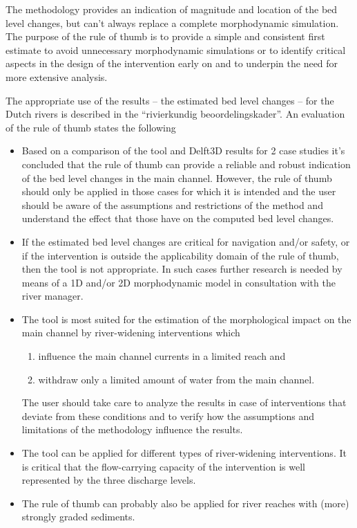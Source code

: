 The methodology provides an indication of magnitude and location of the bed level changes, but can't always replace a complete morphodynamic simulation.
The purpose of the rule of thumb is to provide a simple and consistent first estimate to avoid unnecessary morphodynamic simulations or to identify critical aspects in the design of the intervention early on and to underpin the need for more extensive analysis.

The appropriate use of the results -- the estimated bed level changes -- for the Dutch rivers is described in the ``rivierkundig beoordelingskader''.
An evaluation of the rule of thumb \citep{Paarlberg2009} states the following

\begin{itemize}

\item Based on a comparison of the tool and Delft3D results for 2 case studies it's concluded that the rule of thumb can provide a reliable and robust indication of the bed level changes in the main channel.
However, the rule of thumb should only be applied in those cases for which it is intended and the user should be aware of the assumptions and restrictions of the method and understand the effect that those have on the computed bed level changes.

\item If the estimated bed level changes are critical for navigation and/or safety, or if the intervention is outside the applicability domain of the rule of thumb, then the tool is not appropriate.
In such cases further research is needed by means of a 1D and/or 2D morphodynamic model in consultation with the river manager.

\item The tool is most suited for the estimation of the morphological impact on the main channel by river-widening interventions which
\begin{enumerate}
\item influence the main channel currents in a limited reach and
\item withdraw only a limited amount of water from the main channel.
\end{enumerate}
The user should take care to analyze the results in case of interventions that deviate from these conditions and to verify how the assumptions and limitations of the methodology influence the results.

\item The tool can be applied for different types of river-widening interventions.
It is critical that the flow-carrying capacity of the intervention is well represented by the three discharge levels.

\item The rule of thumb can probably also be applied for river reaches with (more) strongly graded sediments.
\end{itemize}

